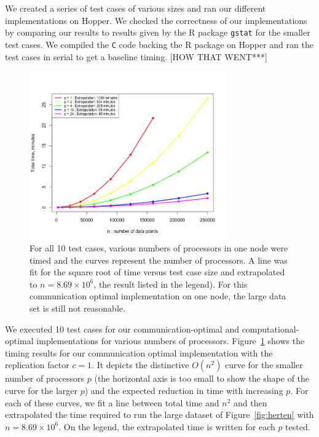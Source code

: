 
We created a series of test cases of various sizes and ran our different implementations on Hopper. We checked the correctness of our implementations by comparing our results to results given by the R package \texttt{gstat} \cite{Pebesma} for the smaller test cases. We compiled the \texttt{C} code backing the R package on Hopper and ran the test cases in serial to get a baseline timing. [HOW THAT WENT***]

\begin{figure}[!h]
   \centering
   \includegraphics[width=0.75\textwidth]{./fig/comm_c1_timings.png} %
   \caption{For all 10 test cases, various numbers of processors in one node were timed and the curves represent the number of processors. A line was fit for the square root of time versus test case size and extrapolated to $n=8.69\times10^6$, the result listed in the legend). For this communication optimal implementation on one node, the large data set is still not reasonable.}
   \label{fig:comm_c1_timings}
\end{figure}

We executed 10 test cases for our communication-optimal and computational-optimal implementations for various numbers of processors. Figure~\ref{fig:comm_c1_timings} shows the timing results for our communication optimal implementation with the replication factor $c=1$. It depicts the distinctive $O(n^2)$ curve for the smaller number of processors $p$ (the horizontal axis is too small to show the shape of the curve for the larger $p$) and the expected reduction in time with increasing $p$. For each of these curves, we fit a line between total time and $n^2$ and then extrapolated the time required to run the large dataset of Figure~\ref{fig:herten} with $n=8.69\times10^6$. On the legend, the extrapolated time is written for each $p$ tested.  

